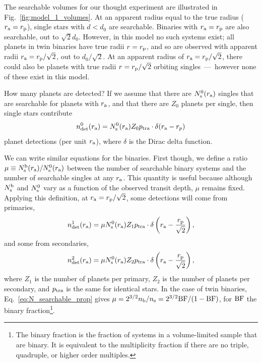 \documentclass[12pt,modern]{aastex61}
\renewcommand{\a}{_{\rm a}}
\newcommand{\s}{_{\rm s}}
\newcommand{\p}{_{\rm p}}
\begin{document}
The searchable volumes for our thought experiment are illustrated 
in Fig.~\ref{fig:model_1_volumes}.
At an apparent radius equal to the true radius ($r\a=r\p$), single stars 
with $d<d_0$ are searchable.
Binaries with $r\a=r\p$ are also searchable, out to $\sqrt{2}d_0$. 
However, in this model no such systems exist; all planets in twin binaries 
have true radii $r=r\p$, and so are observed with apparent radii 
$r\a=r\p/\sqrt{2}$, out to $d_0/\sqrt{2}$.
At an apparent radius of $r\a=r\p/\sqrt{2}$, there could also be planets with 
true radii $r=r\p/\sqrt{2}$ orbiting singles~---~however none of these exist 
in this model.

How many planets are detected?
If we assume that there are $N\s^0(r\a)$ singles that are searchable for 
planets with $r\a$, and that there are $Z_0$ planets per single, then 
single stars contribute
\begin{equation}
n_{\rm det}^0(r\a) = N\s^0(r\a) Z_0 p_{\rm tra} \cdot \delta(r\a - r_p)
\end{equation}
planet detections (per unit $r\a$), where $\delta$ is the Dirac delta function.

We can write similar equations for the binaries.
First though, we define a ratio $\mu \equiv N\s^{\rm b}(r\a) / N\s^0(r\a)$ 
between the number of searchable binary systems and the number of searchable 
singles at any $r\a$.
This quantity is useful because although $N\s^{\rm b}$ and $N\s^0$ vary
as a function of the observed transit depth, $\mu$ remains fixed.
Applying this definition, at $r\a=r\p/\sqrt{2}$, some detections will come 
from primaries,
\begin{equation}
n_{\rm det}^1(r\a) =
\mu N\s^0(r\a) Z_1 p_{\rm tra}
\cdot \delta\left(r\a - \frac{r\p}{\sqrt{2}}\right),
\end{equation}
and some from secondaries,
\begin{equation}
n_{\rm det}^2(r\a) = 
\mu N\s^0(r\a) Z_2 p_{\rm tra}
\cdot \delta\left(r\a - \frac{r\p}{\sqrt{2}}\right),
\end{equation}
where $Z_1$ is the number of planets per primary, $Z_2$ is the number of 
planets per secondary, and $p_{\rm tra}$ is the same for identical stars.
In the case of twin binaries, Eq.~\ref{eq:N_searchable_prop} gives $\mu = 
2^{3/2} n_{\rm b}/n_{\rm s} = 2^{3/2} {\rm BF}/(1-{\rm BF})$, for ${\rm BF}$ 
the binary fraction\footnote{The binary fraction is the fraction of systems in 
a volume-limited sample that are binary. It is equivalent to the multiplicity 
fraction if there are no triple, quadruple, or higher order multiples.
}.
\end{document}
